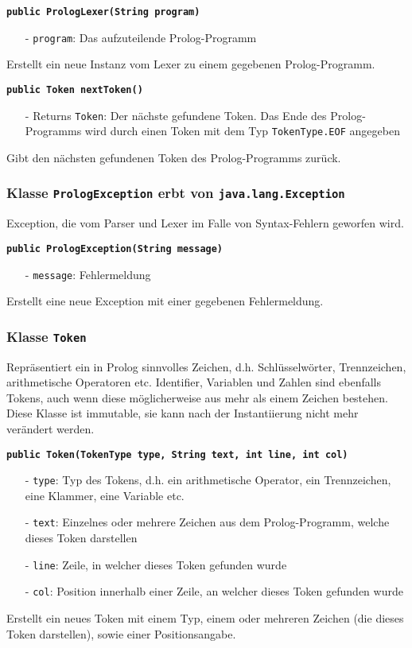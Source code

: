 \documentclass[parskip=full,11pt,twoside]{scrartcl}
\begin{document}
\textbf{\texttt{public PrologLexer(String program)}}
\begin{itemize}[noitemsep]
	\item[-] \texttt{program}: Das aufzuteilende Prolog-Programm
\end{itemize}
Erstellt ein neue Instanz vom Lexer zu einem gegebenen Prolog-Programm.

\textbf{\texttt{public Token nextToken()}}
\begin{itemize}[noitemsep]
	\item[-] Returns \texttt{Token}: Der nächste gefundene Token. Das Ende des Prolog-Programms wird durch einen Token mit dem Typ \texttt{TokenType.EOF} angegeben
\end{itemize}
Gibt den nächsten gefundenen Token des Prolog-Programms zurück.

\subsubsection{Klasse \texttt{PrologException} erbt von \texttt{java.lang.Exception}}

Exception, die vom Parser und Lexer im Falle von Syntax-Fehlern geworfen wird.

\textbf{\texttt{public PrologException(String message)}}
\begin{itemize}[noitemsep]
	\item[-] \texttt{message}: Fehlermeldung
\end{itemize}
Erstellt eine neue Exception mit einer gegebenen Fehlermeldung.

\subsubsection{Klasse \texttt{Token}}

Repräsentiert ein in Prolog sinnvolles Zeichen, d.h. Schlüsselwörter, Trennzeichen, arithmetische Operatoren etc. Identifier, Variablen und Zahlen sind ebenfalls Tokens, auch wenn diese möglicherweise aus mehr als einem Zeichen bestehen. Diese Klasse ist immutable, sie kann nach der Instantiierung nicht mehr verändert werden.

\textbf{\texttt{public Token(TokenType type, String text, int line, int col)}}
\begin{itemize}[noitemsep]
	\item[-] \texttt{type}: Typ des Tokens, d.h. ein arithmetische Operator, ein Trennzeichen, eine Klammer, eine Variable etc.
	\item[-] \texttt{text}: Einzelnes oder mehrere Zeichen aus dem Prolog-Programm, welche dieses Token darstellen
	\item[-] \texttt{line}: Zeile, in welcher dieses Token gefunden wurde
	\item[-] \texttt{col}: Position innerhalb einer Zeile, an welcher dieses Token gefunden wurde
\end{itemize}
Erstellt ein neues Token mit einem Typ, einem oder mehreren Zeichen (die dieses Token darstellen), sowie einer Positionsangabe.
\end{document}
